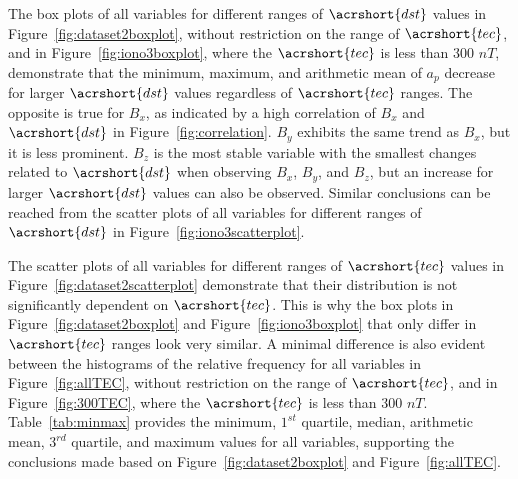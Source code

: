 \documentclass[sn-mathphys-num]{sn-jnl}%
\begin{document}
The box plots of all variables for different ranges of $\acrshort{dst}$ values in Figure~\ref{fig:dataset2boxplot}, without restriction on the range of $\acrshort{tec}$, and in Figure~\ref{fig:iono3boxplot}, where the $\acrshort{tec}$ is less than $300$ $nT$, demonstrate that the minimum, maximum, and arithmetic mean of $a_{p}$ decrease for larger $\acrshort{dst}$ values regardless of $\acrshort{tec}$ ranges. The opposite is true for $B_{x}$, as indicated by a high correlation of $B_{x}$ and $\acrshort{dst}$ in Figure~\ref{fig:correlation}. $B_{y}$ exhibits the same trend as $B_{x}$, but it is less prominent. $B_{z}$ is the most stable variable with the smallest changes related to $\acrshort{dst}$ when observing $B_{x}$, $B_{y}$, and $B_{z}$, but an increase for larger $\acrshort{dst}$ values can also be observed. Similar conclusions can be reached from the scatter plots of all variables for different ranges of $\acrshort{dst}$ in Figure~\ref{fig:iono3scatterplot}. 

The scatter plots of all variables for different ranges of $\acrshort{tec}$ values in Figure~\ref{fig:dataset2scatterplot} demonstrate that their distribution is not significantly dependent on $\acrshort{tec}$. This is why the box plots in Figure~\ref{fig:dataset2boxplot} and Figure~\ref{fig:iono3boxplot} that only differ in $\acrshort{tec}$ ranges look very similar. A minimal difference is also evident between the histograms of the relative frequency for all variables in Figure~\ref{fig:allTEC}, without restriction on the range of $\acrshort{tec}$, and in Figure~\ref{fig:300TEC}, where the $\acrshort{tec}$ is less than $300$ $nT$. Table~\ref{tab:minmax} provides the minimum, $1^{st}$ quartile, median, arithmetic mean, $3^{rd}$ quartile, and maximum values for all variables, supporting the conclusions made based on Figure~\ref{fig:dataset2boxplot} and Figure~\ref{fig:allTEC}.
\end{document}
